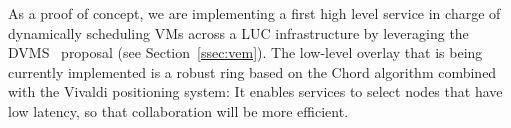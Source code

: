As a proof of concept, we are implementing a first high level service in charge
of dynamically scheduling VMs across a LUC infrastructure by leveraging the
DVMS~\cite{quesnel:2012} proposal (see Section~\ref{ssec:vem}). The low-level
overlay that is being currently implemented is a robust ring based on the  Chord  algorithm
combined with the Vivaldi positioning system: It enables services to select nodes that have
low latency, so that collaboration will be more efficient. 

%

